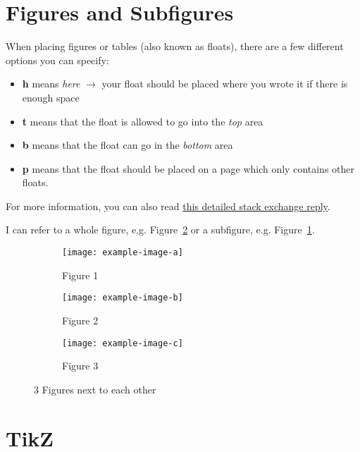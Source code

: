 \documentclass[10pt,parskip=half]{scrartcl}
\begin{document}
\section{Figures and Subfigures}

When placing figures or tables (also known as floats), there are a few different options you can specify: \\
\begin{itemize}
	\item \textbf{h} means \emph{here} $\rightarrow$ your float should be placed where you wrote it if there is enough space
	\item \textbf{t} means that the float is allowed to go into the \emph{top} area
	\item \textbf{b} means that the float can go in the \emph{bottom} area
	\item \textbf{p} means that the float should be placed on a page which only contains other floats. 
\end{itemize}

For more information, you can also read \href{https://tex.stackexchange.com/questions/39017/how-to-influence-the-position-of-float-environments-like-figure-and-table-in-lat/39020#39020}{this detailed stack exchange reply}. 

I can refer to a whole figure, e.g. Figure~\ref{fig:whole_fig} or a subfigure, e.g. Figure~\ref{fig:figure_1}. 

\begin{figure}[htp]
	\begin{subfigure}{0.3\textwidth}
		\texttt{[image: example-image-a]}
		\caption{Figure 1}
		\label{fig:figure_1}
	\end{subfigure}
\begin{subfigure}{0.3\textwidth}
	\texttt{[image: example-image-b]}
	\caption{Figure 2}
\end{subfigure}
\begin{subfigure}{0.3\textwidth}
		\texttt{[image: example-image-c]}
	\caption{Figure 3}
\end{subfigure}
\caption{3 Figures next to each other}
\label{fig:whole_fig}
\end{figure}

\section{TikZ}
\end{document}
